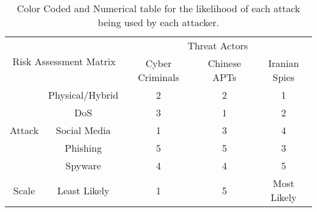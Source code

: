\begin{table}%
  \centering
  \caption{Color Coded and Numerical table for the likelihood of each attack being used by each attacker.}
    \begin{tabular}{|c|c|c|c|c|}
    \toprule
    \multicolumn{2}{|c|}{\multirow{2}[4]{*}{Risk Assessment Matrix}} & \multicolumn{3}{c|}{Threat Actors} \\
\cmidrule{3-5}    \multicolumn{2}{|c|}{} & Cyber Criminals & Chinese APTs & Iranian Spies \\
    \midrule
    \multirow{5}[10]{*}{\begin{sideways}Attack\end{sideways}} & Physical/Hybrid & \cellcolor[rgb]{ .694,  .831,  .498}2 & \cellcolor[rgb]{ .694,  .831,  .498}2 & \cellcolor[rgb]{ .388,  .745,  .482}1 \\
\cmidrule{2-5}          & DoS  & \cellcolor[rgb]{ 1,  .922,  .518}3 & \cellcolor[rgb]{ .388,  .745,  .482}1 & \cellcolor[rgb]{ .694,  .831,  .498}2 \\
\cmidrule{2-5}          & Social Media & \cellcolor[rgb]{ .388,  .745,  .482}1 & \cellcolor[rgb]{ 1,  .922,  .518}3 & \cellcolor[rgb]{ .988,  .667,  .471}4 \\
\cmidrule{2-5}          & Phishing & \cellcolor[rgb]{ .973,  .412,  .42}5 & \cellcolor[rgb]{ .973,  .412,  .42}5 & \cellcolor[rgb]{ 1,  .922,  .518}3 \\
\cmidrule{2-5}          & Spyware & \cellcolor[rgb]{ .988,  .667,  .471}4 & \cellcolor[rgb]{ .988,  .667,  .471}4 & \cellcolor[rgb]{ .973,  .412,  .42}5 \\
    \midrule
    Scale & Least Likely & \cellcolor[rgb]{ .388,  .745,  .482}1 & \cellcolor[rgb]{ .973,  .412,  .42}5 & Most Likely \\
    \bottomrule
    \end{tabular}%
  \label{tab:Threat Matrix}%
\end{table}%

